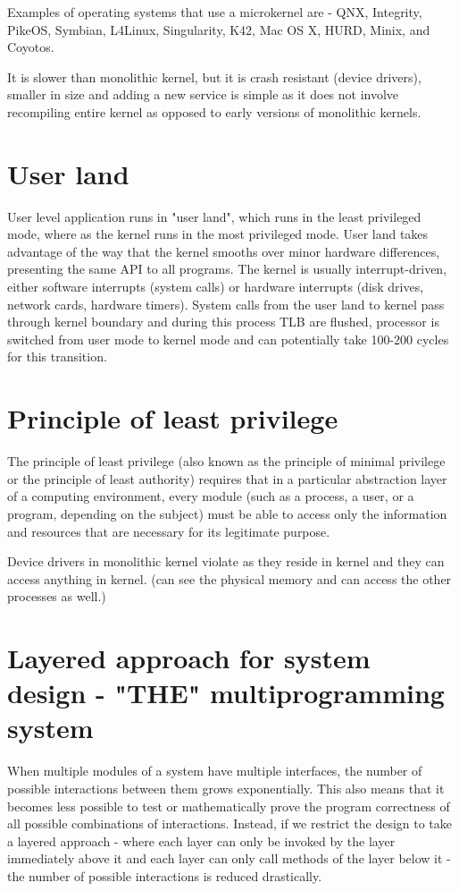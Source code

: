 \documentclass[twoside]{article}
\begin{document}
Examples of operating systems that use a microkernel are - QNX, Integrity, PikeOS, Symbian, L4Linux, Singularity, K42, Mac OS X, HURD, Minix, and Coyotos.

It is slower than monolithic kernel, but it is crash resistant (device drivers), smaller in size and adding a new service is simple as it does not involve recompiling entire kernel as opposed to early versions of monolithic kernels.

\section{User land}

User level application runs in "user land", which runs in the least privileged mode, where as the kernel runs in the most privileged mode. User land takes advantage of the way that the kernel smooths over minor hardware differences, presenting the same API to all programs. The kernel is usually interrupt-driven, either software interrupts (system calls) or hardware interrupts (disk drives, network cards, hardware timers). System calls from the user land to kernel pass through kernel boundary and during this process TLB are flushed, processor is switched from user mode to kernel mode and can potentially take 100-200 cycles for this transition. 

\section{Principle of least privilege}

The principle of least privilege (also known as the principle of minimal privilege or the principle of least authority) requires that in a particular abstraction layer of a computing environment, every module (such as a process, a user, or a program, depending on the subject) must be able to access only the information and resources that are necessary for its legitimate purpose.

Device drivers in monolithic kernel violate as they reside in kernel and they can access anything in kernel. (can see the physical memory and can access the other processes as well.)


\section{Layered approach for system design - "THE" multiprogramming system }

When multiple modules of a system have multiple interfaces, the number of possible interactions between them grows exponentially. This also means that it becomes less possible to test or mathematically prove the program correctness of all possible combinations of interactions. Instead, if we restrict the design to take a layered approach - where each layer can only be invoked by the layer immediately above it and each layer can only call methods of the layer below it - the number of possible interactions is reduced drastically. 
\end{document}
